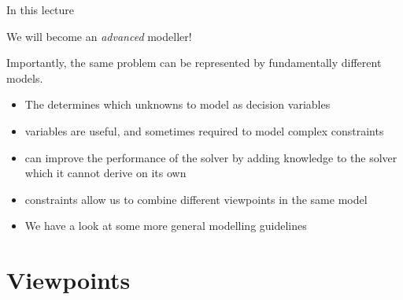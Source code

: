 \documentclass{cons-beamer}
\begin{document}
\begin{frame}{In this lecture}

  We will become an \emph{advanced} modeller!

  Importantly, the same problem can be represented by fundamentally different models.

  \begin{itemize}
    \item The  determines which unknowns to model as decision variables
    \item {} variables are useful, and sometimes required to model complex constraints
    \item {} can improve the performance of the solver by adding knowledge to the solver which it cannot derive on its own
    \item {} constraints allow us to combine different viewpoints in the same model
    \item We have a look at some more general modelling guidelines
  \end{itemize}


\end{frame}
\section{Viewpoints}

\newcommand{\taskAllocationDescription}{
  There are three workers (W1, W2, W3).
  Our current project has 4 tasks that have to be allocated to the workers: Construct Product (CP) and Quality Check (QC), which will be conducted on Thursday, and Package Product (PP) and Transport Product (TP), which will be
  conducted on Friday.
  No worker should handle two tasks on the same day.
  Worker W3 cannot work this on Thursday.
  Worker W1 can only perform tasks QC and TP.
}
\end{document}
